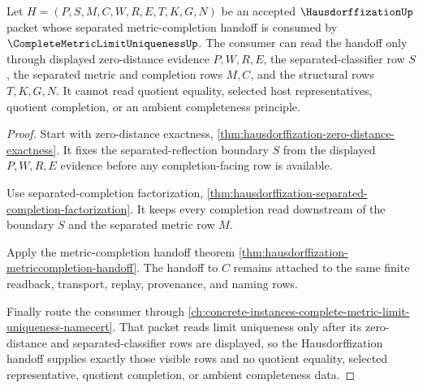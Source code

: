 \begin{theorem}
\label{thm:hausdorffization-complete-metric-limit-uniqueness-route}
Let $H=(P,S,M,C,W,R,E,T,K,G,N)$ be an accepted $\HausdorffizationUp$ packet whose separated metric-completion handoff is consumed by $\CompleteMetricLimitUniquenessUp$. The consumer can read the handoff only through displayed zero-distance evidence $P,W,R,E$, the separated-classifier row $S$, the separated metric and completion rows $M,C$, and the structural rows $T,K,G,N$. It cannot read quotient equality, selected host representatives, quotient completion, or an ambient completeness principle.
\end{theorem}
\begin{proof}
Start with zero-distance exactness, \autoref{thm:hausdorffization-zero-distance-exactness}. It fixes the separated-reflection boundary $S$ from the displayed $P,W,R,E$ evidence before any completion-facing row is available.

Use separated-completion factorization, \autoref{thm:hausdorffization-separated-completion-factorization}. It keeps every completion read downstream of the boundary $S$ and the separated metric row $M$.

Apply the metric-completion handoff theorem \autoref{thm:hausdorffization-metriccompletion-handoff}. The handoff to $C$ remains attached to the same finite readback, transport, replay, provenance, and naming rows.

Finally route the consumer through \autoref{ch:concrete-instances-complete-metric-limit-uniqueness-namecert}. That packet reads limit uniqueness only after its zero-distance and separated-classifier rows are displayed, so the Hausdorffization handoff supplies exactly those visible rows and no quotient equality, selected representative, quotient completion, or ambient completeness data.
\end{proof}

